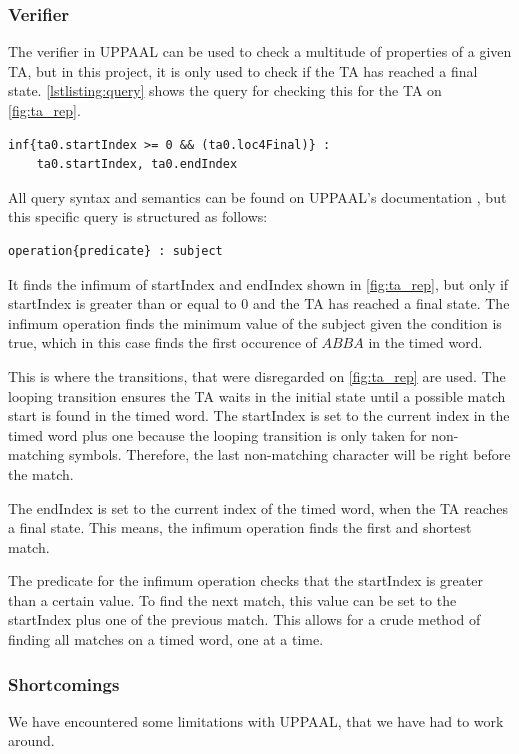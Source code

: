 \subsubsection{Verifier}\label{subsubsec:verifier}
The verifier in UPPAAL can be used to check a multitude of properties of a given TA, but in this project, it is only used to check if the TA has reached a final state. \cref{lstlisting:query} shows the query for checking this for the TA on \cref{fig:ta_rep}.

\begin{lstlisting}[basicstyle=\scriptsize]
    inf{ta0.startIndex >= 0 && (ta0.loc4Final)} : 
    ta0.startIndex, ta0.endIndex
\end{lstlisting}
\label{lstlisting:query}

All query syntax and semantics can be found on UPPAAL's documentation \cite{UPPAAL}, but this specific query is structured as follows:
\begin{lstlisting}[basicstyle=\scriptsize]
    operation{predicate} : subject
\end{lstlisting}
It finds the infimum of startIndex and endIndex shown in \cref{fig:ta_rep}, but only if startIndex is greater than or equal to 0 and the TA has reached a final state. The infimum operation finds the minimum value of the subject given the condition is true, which in this case finds the first occurence of $ABBA$ in the timed word.

This is where the transitions, that were disregarded on \cref{fig:ta_rep} are used. The looping transition ensures the TA waits in the initial state until a possible match start is found in the timed word. The startIndex is set to the current index in the timed word plus one because the looping transition is only taken for non-matching symbols. Therefore, the last non-matching character will be right before the match.

The endIndex is set to the current index of the timed word, when the TA reaches a final state. This means, the infimum operation finds the first and shortest match.

The predicate for the infimum operation checks that the startIndex is greater than a certain value. To find the next match, this value can be set to the startIndex plus one of the previous match. This allows for a crude method of finding all matches on a timed word, one at a time.

\subsubsection{Shortcomings}\label{subsubsec:shortcomings}
We have encountered some limitations with UPPAAL, that we have had to work around.

